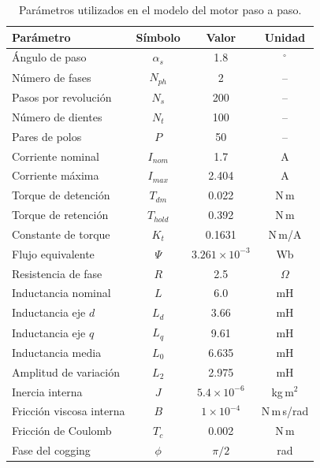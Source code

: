 \begin{table}[htbp]
    \centering
    \caption{Parámetros utilizados en el modelo del motor paso a paso.}
    \label{tab:parametros_motor_anexo}
    \begin{tabular}{lccc}
        \hline
        \textbf{Parámetro} &
        \textbf{Símbolo} &
        \textbf{Valor} &
        \textbf{Unidad} \\
        \hline
        Ángulo de paso              & $\alpha_s$ & 1.8 & $^\circ$ \\
        Número de fases             & $N_{ph}$   & 2 & -- \\
        Pasos por revolución        & $N_s$      & 200 & -- \\
        Número de dientes           & $N_t$      & 100 & -- \\
        Pares de polos              & $P$        & 50 & -- \\
        Corriente nominal           & $I_{nom}$  & 1.7 & A \\
        Corriente máxima            & $I_{max}$  & 2.404 & A \\
        Torque de detención         & $T_{dm}$   & 0.022 & N\,m \\
        Torque de retención         & $T_{hold}$ & 0.392 & N\,m \\
        Constante de torque         & $K_t$      & 0.1631 & N\,m/A \\
        Flujo equivalente           & $\Psi$     & $3.261\times10^{-3}$ & Wb \\
        Resistencia de fase         & $R$        & 2.5 & $\Omega$ \\
        Inductancia nominal         & $L$        & 6.0 & mH \\
        Inductancia eje $d$         & $L_d$      & 3.66 & mH \\
        Inductancia eje $q$         & $L_q$      & 9.61 & mH \\
        Inductancia media           & $L_0$      & 6.635 & mH \\
        Amplitud de variación       & $L_2$      & 2.975 & mH \\
        Inercia interna             & $J$        & $5.4\times10^{-6}$ & kg\,m$^2$ \\
        Fricción viscosa interna    & $B$        & $1\times10^{-4}$ & N\,m\,s/rad \\
        Fricción de Coulomb         & $T_c$      & 0.002 & N\,m \\
        Fase del cogging            & $\phi$     & $\pi/2$ & rad \\
        \hline
    \end{tabular}
\end{table}

